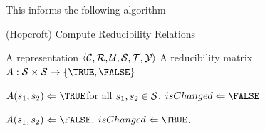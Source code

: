 This informs the following algorithm
\begin{algorithm}                      %
\label{algo: Hopcroft}
\caption{(Hopcroft) Compute Reducibility Relations}          %
\label{alg1}                           %
\begin{algorithmic}                    %
  \REQUIRE A representation $\ang{\C,\R,\U,\S,\T,\Y}$
  \ENSURE A reducibility matrix $A:\S\times\S\to\{\TRUE,\FALSE\}$.
  \bigskip
  
  \STATE $A(s_1, s_2)\Leftarrow \TRUE$\quad for all $s_1,s_2\in\S$.
  \REPEAT
    \STATE $isChanged \Leftarrow \FALSE$
	  
			  \STATE $A(s_1,s_2)\Leftarrow\FALSE$.
			  \STATE $isChanged\Leftarrow\TRUE$.
			\ENDIF
		  \ENDFOR
		\ENDFOR
	  \ENDIF
    \ENDFOR
\end{algorithmic}
\end{algorithm}


